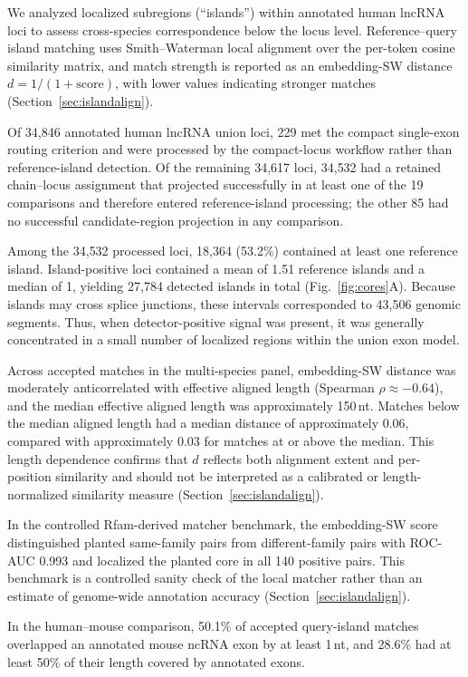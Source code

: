 We analyzed localized subregions (``islands'') within annotated human lncRNA loci
to assess cross-species correspondence below the locus level. Reference--query
island matching uses Smith--Waterman local alignment over the per-token cosine
similarity matrix, and match strength is reported as an embedding-SW distance
$d = 1/(1+\mathrm{score})$, with lower values indicating stronger matches
(Section~\ref{sec:islandalign}).

Of 34{,}846 annotated human lncRNA union loci, 229 met the compact single-exon
routing criterion and were processed by the compact-locus workflow rather than
reference-island detection. Of the remaining 34{,}617 loci, 34{,}532 had a
retained chain--locus assignment that projected successfully in at least one of
the 19 comparisons and therefore entered reference-island processing; the other
85 had no successful candidate-region projection in any comparison.

Among the 34{,}532 processed loci, 18{,}364 (53.2\%) contained at least one
reference island. Island-positive loci contained a mean of 1.51 reference islands
and a median of 1, yielding 27{,}784 detected islands in total
(Fig.~\ref{fig:cores}A). Because islands may cross splice junctions, these
intervals corresponded to 43{,}506 genomic segments. Thus, when detector-positive
signal was present, it was generally concentrated in a small number of localized
regions within the union exon model.

Across accepted matches in the multi-species panel, embedding-SW distance was
moderately anticorrelated with effective aligned length
(Spearman $\rho \approx -0.64$), and the median effective aligned length was
approximately 150\,nt. Matches below the median aligned length had a median
distance of approximately 0.06, compared with approximately 0.03 for matches at
or above the median. This length dependence confirms that $d$ reflects both
alignment extent and per-position similarity and should not be interpreted as a
calibrated or length-normalized similarity measure
(Section~\ref{sec:islandalign}).

In the controlled Rfam-derived matcher benchmark, the embedding-SW score
distinguished planted same-family pairs from different-family pairs with
ROC-AUC 0.993 and localized the planted core in all 140 positive pairs. This
benchmark is a controlled sanity check of the local matcher rather than an
estimate of genome-wide annotation accuracy
(Section~\ref{sec:islandalign}).

In the human--mouse comparison, 50.1\% of accepted query-island matches
overlapped an annotated mouse ncRNA exon by at least 1\,nt, and 28.6\% had at
least 50\% of their length covered by annotated exons.

